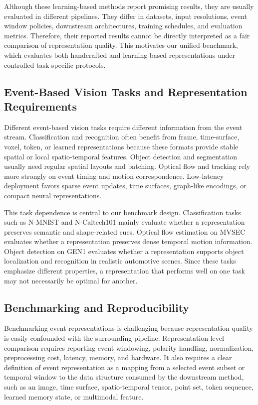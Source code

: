 \documentclass[letterpaper]{article}
\begin{document}
Although these learning-based methods report promising results, they are usually evaluated in different pipelines. They differ in datasets, input resolutions, event window policies, downstream architectures, training schedules, and evaluation metrics. Therefore, their reported results cannot be directly interpreted as a fair comparison of representation quality. This motivates our unified benchmark, which evaluates both handcrafted and learning-based representations under controlled task-specific protocols.

\subsection{Event-Based Vision Tasks and Representation Requirements}
Different event-based vision tasks require different information from the event stream. Classification and recognition often benefit from frame, time-surface, voxel, token, or learned representations because these formats provide stable spatial or local spatio-temporal features. Object detection and segmentation usually need regular spatial layouts and batching. Optical flow and tracking rely more strongly on event timing and motion correspondence. Low-latency deployment favors sparse event updates, time surfaces, graph-like encodings, or compact neural representations.

This task dependence is central to our benchmark design. Classification tasks such as N-MNIST and N-Caltech101 mainly evaluate whether a representation preserves semantic and shape-related cues. Optical flow estimation on MVSEC evaluates whether a representation preserves dense temporal motion information. Object detection on GEN1 evaluates whether a representation supports object localization and recognition in realistic automotive scenes. Since these tasks emphasize different properties, a representation that performs well on one task may not necessarily be optimal for another.

\subsection{Benchmarking and Reproducibility}
Benchmarking event representations is challenging because representation quality is easily confounded with the surrounding pipeline. Representation-level comparison requires reporting event windowing, polarity handling, normalization, preprocessing cost, latency, memory, and hardware. It also requires a clear definition of event representation as a mapping from a selected event subset or temporal window to the data structure consumed by the downstream method, such as an image, time surface, spatio-temporal tensor, point set, token sequence, learned memory state, or multimodal feature.
\end{document}
